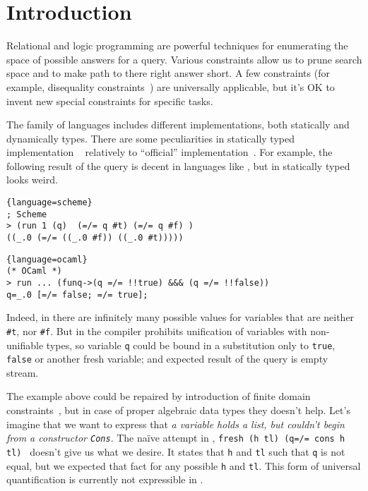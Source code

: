 \section{Introduction}
\label{sec:intro}

Relational and logic programming are powerful techniques for enumerating the space of possible answers for a query. Various constraints allow us to prune search space and to make path to there right answer short. A few constraints (for example, disequality constraints~\cite{?}) are universally applicable, but it's OK to invent new special constraints for specific tasks. 

The \miniKanren{} family of languages includes different implementations, both statically and dynamically types. There are some peculiarities in statically typed implementation \OCanren{}~\cite{ocanren} relatively to ``official'' implementation~\cite{fasterMK}. For example, the following result of the query is decent in languages like 
\Scheme{}, but in statically typed \OCaml{} looks weird.

\begin{minipage}{7cm}
\begin{lstlisting}{language=scheme}
; Scheme
> (run 1 (q)  (=/= q #t) (=/= q #f) )
((_.0 (=/= ((_.0 #f)) ((_.0 #t)))))
\end{lstlisting}
\end{minipage}
\begin{minipage}{9.5cm}
\begin{lstlisting}{language=ocaml}
(* OCaml *)
> run ... (funq->(q =/= !!true) &&& (q =/= !!false))
q=_.0 [=/= false; =/= true];
\end{lstlisting}
\end{minipage}

\noindent Indeed, in \Scheme{} there are infinitely many possible values for variables that are neither \lstinline[]=#t=, nor 
\lstinline[]=#f=. But in \OCanren{} the compiler prohibits unification of variables with non-unifiable types, so variable \verb=q= could be bound in a substitution only to \lstinline=true=, \lstinline=false= or another fresh variable; and expected result of the query is empty stream.

The example above could be repaired by introduction of finite domain constraints~\cite{cKanren}, but in case of proper algebraic data types they doesn't help. Let's imagine that we want to express that \emph{a variable holds a list, but couldn't begin from a constructor \lstinline=Cons=}. The na\"{i}ve attempt in \OCanren{}, \lstinline|fresh (h tl) (q=/= cons h tl) | doesn't give us what we desire. It states that  \lstinline|h| and \lstinline|tl| such that \lstinline|q| is not equal, but we expected that fact for any possible \lstinline|h| and \lstinline|tl|. This form of universal quantification is currently not expressible in \OCanren{}.

